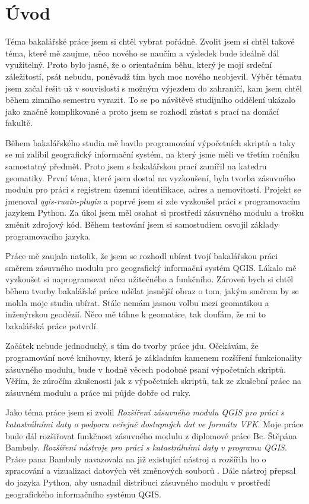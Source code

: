 \chapter{Úvod}
\label{1-uvod}

Téma bakalářské práce jsem si chtěl vybrat pořádně. Zvolit jsem si
chtěl takové téma, které mě zaujme, něco nového se naučím a výsledek
bude ideálně dál využitelný. Proto bylo jasné, že o orientačním běhu,
který je mojí srdeční záležitostí, psát nebudu, poněvadž tím bych moc
nového neobjevil. Výběr tématu jsem začal řešit už v souvislosti s
možným výjezdem do zahraničí, kam jsem chtěl během zimního semestru
vyrazit. To se po návštěvě studijního oddělení ukázalo jako značně
komplikované a proto jsem se rozhodl zůstat s prací na domácí fakultě.

Během bakalářského studia mě bavilo programování výpočetních skriptů a
taky se mi zalíbil geografický informační systém, na který jsme měli
ve třetím ročníku samostatný předmět. Proto jsem s bakalářskou prací
zamířil na katedru geomatiky. První téma, které jsem dostal na
vyzkoušení, byla tvorba zásuvného modulu pro práci s registrem územní
identifikace, adres a nemovitostí. Projekt se jmenoval
\textit{qgis-ruain-plugin} a poprvé jsem si zde vyzkoušel práci s
programovacím jazykem Python. Za úkol jsem měl osahat si prostředí
zásuvného modulu a trošku změnit zdrojový kód. Během testování jsem si
samostudiem osvojil základy programovacího jazyka.

Práce mě zaujala natolik, že jsem se rozhodl ubírat tvojí bakalářskou
práci směrem zásuvného modulu pro geografický informační systém
QGIS. Lákalo mě vyzkoušet si naprogramovat něco užitečného a
funkčního. Zároveň bych si chtěl během tvorby bakalářské práce udělat
jasnější obraz o tom, jakým směrem by se mohla moje studia
ubírat. Stále nemám jasnou volbu mezi geomatikou a inženýrskou
geodézií. Něco mě táhne k geomatice, tak doufám, že mi to bakalářská
práce potvrdí.

Začátek nebude jednoduchý, s tím do tvorby práce jdu. Očekávám, že
programování nové knihovny, která je základním kamenem rozšíření
funkcionality zásuvného modulu, bude v hodně věcech podobné psaní
výpočetních skriptů.  Věřím, že zúročím zkušenosti jak z výpočetních
skriptů, tak ze zkušební práce na zásuvném modulu a práce mi půjde
dobře od ruky.

Jako téma práce jsem si zvolil \textit{Rozšíření zásuvného modulu QGIS
  pro práci s katastrálními daty o podporu veřejně dostupných dat ve
  formátu VFK}.  Moje práce bude dál rozšiřovat funkčnost zásuvného
modulu z diplomové práce Bc. Štěpána Bambuly. \textit{Rozšíření
  nástroje pro práci s katastrálními daty v programu QGIS}. Práce pana
Bambuly navazovala na již existující nástroj a rozšířila ho o
zpracování a vizualizaci datových vět změnových souborů . Dále
nástroj přepsal do jazyka Python, aby usnadnil distribuci zásuvného
modulu v prostředí geografického informačního systému QGIS.

